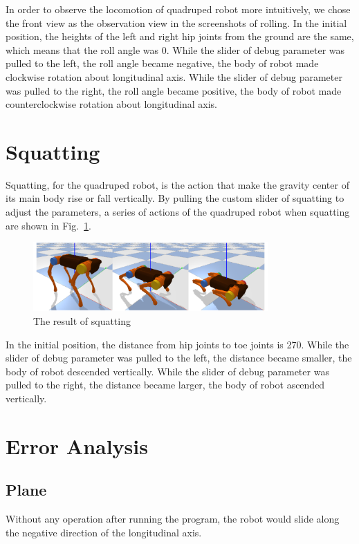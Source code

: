 In order to observe the locomotion of quadruped robot more intuitively, we chose the front view as the observation view in the screenshots of rolling. In the initial position, the heights of the left and right hip joints from the ground are the same, which means that the roll angle was 0. While the slider of debug parameter was pulled to the left, the roll angle became negative, the body of robot made clockwise rotation about longitudinal axis. While the slider of debug parameter was pulled to the right, the roll angle became positive, the body of robot made counterclockwise rotation about longitudinal axis.



\section{Squatting}

Squatting, for the quadruped robot, is the action that make the gravity center of its main body rise or fall vertically. By pulling the custom slider of squatting to adjust the parameters, a series of actions of the quadruped robot when squatting are shown in Fig.~\ref{fig:squatting}.

\begin{figure}[htbp]
    \centering
    \includegraphics[width=0.8\textwidth]{figures/squatting.png}
    \caption{The result of squatting}
    \label{fig:squatting}
\end{figure}

In the initial position, the distance from hip joints to toe joints is 270. While the slider of debug parameter was pulled to the left, the distance became smaller, the body of robot descended vertically. While the slider of debug parameter was pulled to the right, the distance became larger, the body of robot ascended vertically.


\section{Error Analysis}

\subsection{Plane}

Without any operation after running the program, the robot would slide along the negative direction of the longitudinal axis. 




\subsection{}